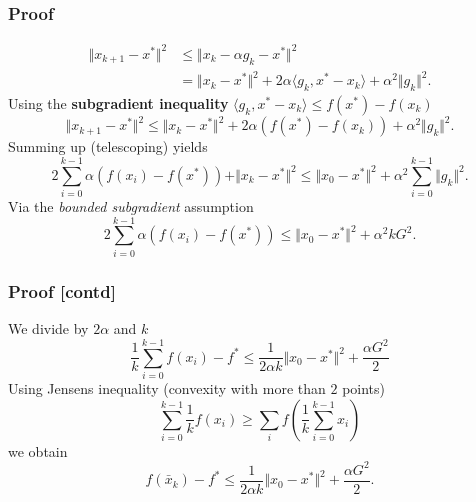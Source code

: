 \documentclass{beamer}
\begin{document}
\begin{frame}
  \frametitle{Proof}
  \vspace{-0.5cm}
  \begin{equation}
    \begin{aligned}
      \Vert x_{k+1} - x^* \Vert^2 &\le \Vert x_k - \alpha g_k - x^* \Vert^2 \\
      &= \Vert x_k-x^* \Vert^2 + 2 \alpha \langle g_k, x^*-x_k \rangle + \alpha^2 \Vert g_k \Vert^2.
    \end{aligned}
  \end{equation}
  Using the \textbf{subgradient inequality} $\langle g_k , x^* -x_k \rangle \le f(x^*) - f(x_k)$
  \begin{equation}
    \Vert x_{k+1} - x^* \Vert^2 \le \Vert x_k-x^* \Vert^2 + 2 \alpha(f(x^*) - f(x_k)) + \alpha^2 \Vert g_k \Vert^2.
  \end{equation}
  Summing up (telescoping) yields
  \begin{equation}
    \label{eq:telescoping}
    2\sum_{i=0}^{k-1}  \alpha(f(x_i) - f(x^*)) + \Vert x_{k} - x^* \Vert^2 \le \Vert x_0-x^* \Vert^2 +  \alpha^2 \sum_{i=0}^{k-1} \Vert g_k \Vert^2.
  \end{equation}
  Via the \emph{bounded subgradient} assumption
  \begin{equation}
    2\sum_{i=0}^{k-1}  \alpha(f(x_i) - f(x^*)) \le \Vert x_0-x^* \Vert^2 +  \alpha^2 k G^2.
  \end{equation}
\end{frame}

\begin{frame}
  \frametitle{Proof [contd]}
  We divide by $2\alpha$ and $k$
  \begin{equation}
    \frac{1}{k}\sum_{i=0}^{k-1}  f(x_i) - f^*  \le \frac{1}{2 \alpha k} \Vert x_0-x^* \Vert^2 +  \frac{\alpha G^2}{2}
  \end{equation}
  Using Jensens inequality (convexity with more than $2$ points)
  \begin{equation}
    \sum_{i=0}^{k-1} \frac{1}{k} f(x_i) \ge \sum_{i} f \left( \frac{1}{k}\sum_{i=0}^{k-1}x_i \right)
  \end{equation}
  we obtain
  \begin{equation}
    f(\bar{x}_k) - f^*  \le \frac{1}{2 \alpha k} \Vert x_0-x^* \Vert^2 + \frac{\alpha G^2}{2}.
  \end{equation}

\end{frame}
\end{document}

